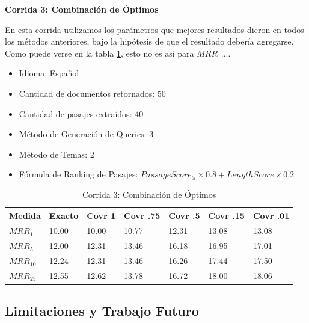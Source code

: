 \textbf{Corrida 3: Combinación de Óptimos}\newline

En esta corrida utilizamos los parámetros que mejores resultados dieron en todos los métodos anteriores, bajo la hipótesis de que el resultado debería agregarse. Como puede verse en la tabla \ref{table:optimos}, esto no es así para $MRR_1$....\newline


\begin{itemize}
  \item Idioma: Español
  \item Cantidad de documentos retornados: 50
  \item Cantidad de pasajes extraídos: 40
  \item Método de Generación de Queries: 3
  \item Método de Temas: 2
  \item Fórmula de Ranking de Pasajes:  $PassageScore_{bl} \times 0.8 + LengthScore \times 0.2$
\end{itemize}

\begin{table}[H]
\centering
\begin{center}
\begin{tabular}{|l | l | l | l | l | l | l |}
\hline
Medida & Exacto & Covr 1 & Covr .75 & Covr .5 & Covr .15 & Covr .01 \\ \hline
$MRR_{1}$ & 10.00 & 10.00 & 10.77 & 12.31 & 13.08 & 13.08  \\ \hline
$MRR_{5}$ & 12.00 & 12.31 & 13.46 & 16.18 & 16.95 & 17.01  \\ \hline
$MRR_{10}$ & 12.24 & 12.31 & 13.46 & 16.26 & 17.44 & 17.50  \\ \hline
$MRR_{25}$ & 12.55 & 12.62 & 13.78 & 16.72 & 18.00 & 18.06  \\ \hline
\end{tabular}
\label{table:optimos}

\medskip

\caption{Corrida 3: Combinación de Óptimos}
\end{center}
\end{table}

\subsection{Limitaciones y Trabajo Futuro}
\label{sec:clef-cierre}



